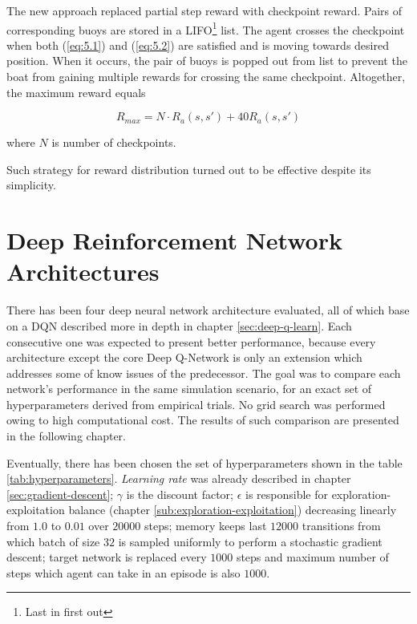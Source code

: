 The new approach replaced partial step reward with checkpoint reward. Pairs of corresponding buoys are stored in a LIFO\footnote{Last in first out} list. The agent crosses the checkpoint when both (\ref{eq:5.1}) and (\ref{eq:5.2}) are satisfied and is moving towards desired position. When it occurs, the pair of buoys is popped out from list to prevent the boat from gaining multiple rewards for crossing the same checkpoint. Altogether, the maximum reward equals 

\begin{equation}
R_{max} = N \cdot R_a(s, s') + 40R_a(s, s')
\end{equation}

where $N$ is number of checkpoints.

Such strategy for reward distribution turned out to be effective despite its simplicity.

\section{Deep Reinforcement Network Architectures}
\label{sec:dnn-architectures}

There has been four deep neural network architecture evaluated, all of which base on a DQN described more in depth in chapter \ref{sec:deep-q-learn}. Each consecutive one was expected to present better performance, because every architecture except the core Deep Q-Network is only an extension which addresses some of know issues of the predecessor. The goal was to compare each network's performance in the same simulation scenario, for an exact set of hyperparameters derived from empirical trials. No grid search was performed owing to high computational cost. The results of such comparison are presented in the following chapter. 

Eventually, there has been chosen the set of hyperparameters shown in the table \ref{tab:hyperparameters}. \emph{Learning rate} was already described in chapter \ref{sec:gradient-descent}; $\gamma$ is the discount factor; $\epsilon$ is responsible for exploration-exploitation balance (chapter \ref{sub:exploration-exploitation}) decreasing linearly from $1.0$ to $0.01$ over $20000$ steps; memory keeps last $12000$ transitions from which batch of size $32$ is sampled uniformly to perform a stochastic
gradient descent; target network is replaced every $1000$ steps and maximum number of steps which agent can take in an episode
is also $1000$.

